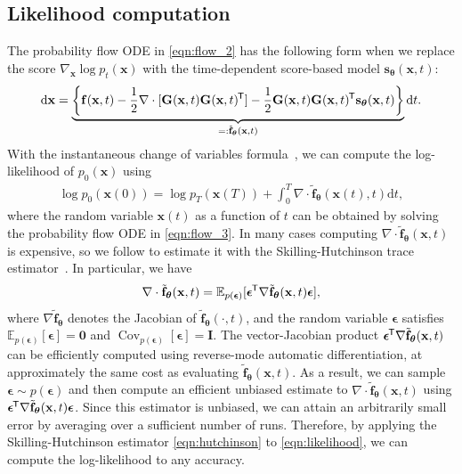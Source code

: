 \documentclass{article} %
\newcommand*{\tran}{^{\mkern-1.5mu\mathsf{T}}}
\newcommand{\bs}[1]{\boldsymbol{#1}}
\newcommand{\mbb}[1]{\mathbb{#1}}
\newcommand{\ud}{\mathrm{d}}
\newcommand{\bfx}{\mathbf{x}}
\newcommand{\bfI}{\mathbf{I}}
\newcommand{\bff}{\mathbf{f}}
\newcommand{\bfzero}{\mathbf{0}}
\newcommand{\bfe}{{\bs{\epsilon}}}
\newcommand{\bftheta}{{\boldsymbol{\theta}}}
\newcommand{\bfs}{\mathbf{s}}
\newcommand{\bfG}{\mathbf{G}}
\begin{document}
\subsection{Likelihood computation}\label{app:prob_flow_likelihood}
The probability flow ODE in \cref{eqn:flow_2} has the following form when we replace the score $\nabla_\bfx \log p_t(\bfx)$ with the time-dependent score-based model $\bfs_\bftheta(\bfx, t)$:
\begin{align}
      \ud \bfx = \underbrace{\bigg\{\bff(\bfx, t) - \frac{1}{2} \nabla \cdot [\bfG(\bfx, t)\bfG(\bfx, t)\tran] - \frac{1}{2} \bfG(\bfx, t)\bfG(\bfx, t)\tran \bfs_\bftheta(\bfx, t)\bigg\}}_{=: \tilde{\bff}_\bftheta(\bfx, t)} \ud t. \label{eqn:flow_3}
\end{align}
With the instantaneous change of variables formula~\citep{chen2018neural}, we can compute the log-likelihood of $p_0(\bfx)$ using
\begin{align}
    \log p_0(\bfx(0)) = \log p_T(\bfx(T)) + \int_0^T \nabla \cdot \tilde{\bff}_\bftheta(\bfx(t), t) \ud t, \label{eqn:likelihood}
\end{align}
where the random variable $\bfx(t)$ as a function of $t$ can be obtained by solving the probability flow ODE in \cref{eqn:flow_3}. In many cases computing $\nabla \cdot \tilde{\bff}_\bftheta(\bfx, t)$ is expensive, so we follow \citet{grathwohl2018ffjord} to estimate it with the Skilling-Hutchinson trace estimator~\citep{skilling1989eigenvalues,hutchinson1990stochastic}. In particular, we have
\begin{align}
    \nabla \cdot \tilde{\bff}_\bftheta(\bfx, t) = \mbb{E}_{p(\bfe)}[\bfe\tran \nabla \tilde{\bff}_\bftheta(\bfx, t)\bfe], \label{eqn:hutchinson}
\end{align}
where $\nabla \tilde{\bff}_\bftheta$ denotes the Jacobian of $\tilde{\bff}_\bftheta(\cdot, t)$, and the random variable $\bfe$ satisfies $\mbb{E}_{p(\bfe)}[\bfe] = \bfzero$ and $\operatorname{Cov}_{p(\bfe)}[\bfe] = \bfI$. The vector-Jacobian product $\bfe\tran \nabla\tilde{\bff}_\bftheta(\bfx, t)$ can be efficiently computed using reverse-mode automatic differentiation, at approximately the same cost as evaluating $\tilde{\bff}_\bftheta(\bfx, t)$. As a result, we can sample $\bfe \sim p(\bfe)$ and then compute an efficient unbiased estimate to $\nabla \cdot \tilde{\bff}_\bftheta(\bfx, t)$ using $\bfe\tran \nabla \tilde{\bff}_\bftheta(\bfx, t) \bfe$. Since this estimator is unbiased, we can attain an arbitrarily small error by averaging over a sufficient number of runs. Therefore, by applying the Skilling-Hutchinson estimator \cref{eqn:hutchinson} to \cref{eqn:likelihood}, we can compute the log-likelihood to any accuracy.
\end{document}
